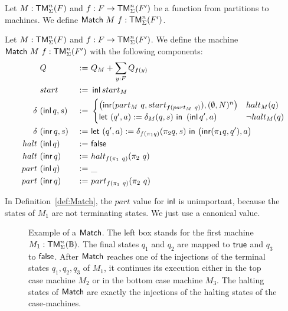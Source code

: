Let $M : \mathsf{TM}_\Sigma^n(F)$ and $f : F \rightarrow \mathsf{TM}_\Sigma^n(F')$ be a function from partitions to machines.  We define
$\mathsf{Match}~M~f : \mathsf{TM}_\Sigma^n(F')$.

\begin{definition}[$\MS{Match}~M~f$]
  \label{def:Match}
  Let $M : \mathsf{TM}_\Sigma^n(F)$ and $f : F \rightarrow \mathsf{TM}_\Sigma^n(F')$.  We define the machine $\mathsf{Match}~M~f : \mathsf{TM}_\Sigma^n(F')$ with the following
  components:
  \begin{alignat*}{3}
    & Q                  &~:=~& Q_M +  \sum_{y:F} Q_{f(y)} \\
    & start              &~:=~& \operatorname{\mathsf{inl}} start_M \\
    \delta ~&(\operatorname{\mathsf{inl}} q, s) &~:=~&
    \begin{cases}
      \bigl(\operatorname{\mathsf{inr}} (part_M~q, start_{f (part_M~q)}), (\emptyset, N)^n \bigr) & halt_M(q) \\
      \mathsf{let}~(q', a) := \delta_M(q, s)~\mathsf{in}~\left(\operatorname{\mathsf{inl}} q', a \right) & \lnot halt_M(q)
    \end{cases} \\
    \delta ~&(\operatorname{\mathsf{inr}} q, s) &~:=~& \mathsf{let}~(q', a) := \delta_{f(\pi_1 q)} (\pi_2 q, s)~\mathsf{in}~\bigl( \operatorname{\mathsf{inr}} (\pi_1 q, q'), a \bigr) \\
    halt   ~&(\operatorname{\mathsf{inl}}  q)   &~:=~& \mathsf{false} \\
    halt   ~&(\operatorname{\mathsf{inr}}  q)   &~:=~& halt_{f(\pi_1~q)} (\pi_2~q) \\
    part   ~&(\operatorname{\mathsf{inl}}  q)   &~:=~& \_ \\
    part   ~&(\operatorname{\mathsf{inr}}  q)   &~:=~& part_{f(\pi_1~q)} (\pi_2~q)
  \end{alignat*}
\end{definition}

In Definition~\ref{def:Match}, the $part$ value for $\operatorname{\mathsf{inl}}$ is unimportant, because the states of $M_1$ are not terminating states.  We just use a
canonical value.

\begin{figure}
  \center
  
  \caption{Example of a $\mathsf{Match}$.  The left box stands for the first machine $M_1:\mathsf{TM}_\Sigma^n(\mathbb{B})$.  The final states $q_1$ and $q_2$ are
    mapped to $\mathsf{true}$ and $q_3$ to $\mathsf{false}$.  After $\mathsf{Match}$ reaches one of the injections of the terminal states $q_1, q_2, q_3$ of $M_1$, it
    continues its execution either in the top case machine $M_2$ or in the bottom case machine $M_3$.  The halting states of $\mathsf{Match}$ are exactly
    the injections of the halting states of the case-machines.}
  \label{fig:match}
\end{figure}

